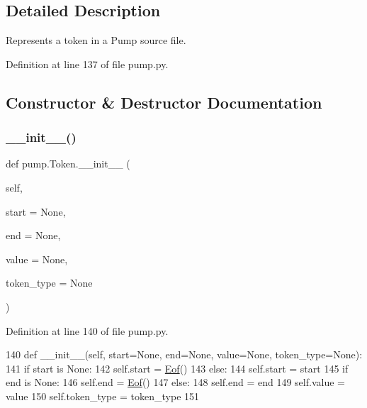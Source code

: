 \subsection{Detailed Description}
\begin{DoxyVerb}Represents a token in a Pump source file.\end{DoxyVerb}
 

Definition at line 137 of file pump.\+py.



\subsection{Constructor \& Destructor Documentation}
\mbox{\label{classpump_1_1Token_a55e6843fd724dc3771861372d5116f48}} 
\subsubsection{\texorpdfstring{\+\_\+\+\_\+init\+\_\+\+\_\+()}{\_\_init\_\_()}}
{\footnotesize\ttfamily def pump.\+Token.\+\_\+\+\_\+init\+\_\+\+\_\+ (\begin{DoxyParamCaption}\item[{}]{self,  }\item[{}]{start = {\ttfamily None},  }\item[{}]{end = {\ttfamily None},  }\item[{}]{value = {\ttfamily None},  }\item[{}]{token\+\_\+type = {\ttfamily None} }\end{DoxyParamCaption})}



Definition at line 140 of file pump.\+py.


\begin{DoxyCode}
140   \textcolor{keyword}{def }\_\_init\_\_(self, start=None, end=None, value=None, token\_type=None):
141     \textcolor{keywordflow}{if} start \textcolor{keywordflow}{is} \textcolor{keywordtype}{None}:
142       self.start = \hyperlink{namespacepump_a38844b22bd5a51c098b07c2c36c5c5b3}{Eof}()
143     \textcolor{keywordflow}{else}:
144       self.start = start
145     \textcolor{keywordflow}{if} end \textcolor{keywordflow}{is} \textcolor{keywordtype}{None}:
146       self.end = \hyperlink{namespacepump_a38844b22bd5a51c098b07c2c36c5c5b3}{Eof}()
147     \textcolor{keywordflow}{else}:
148       self.end = end
149     self.value = value
150     self.token\_type = token\_type
151 
\end{DoxyCode}


